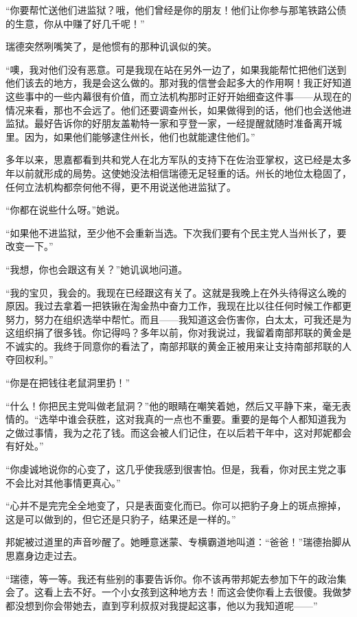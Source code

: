 \par “你要帮忙送他们进监狱？哦，他们曾经是你的朋友！他们让你参与那笔铁路公债的生意，你从中赚了好几千呢！”
\par 瑞德突然咧嘴笑了，是他惯有的那种讥讽似的笑。
\par “噢，我对他们没有恶意。可是我现在站在另外一边了，如果我能帮忙把他们送到他们该去的地方，我是会这么做的。那对我的信誉会起多大的作用啊！我正好知道这些事中的一些内幕很有价值，而立法机构那时正好开始细查这件事——从现在的情况来看，那也不会远了。他们还要调查州长，如果做得到的话，他们也会送他进监狱。最好告诉你的好朋友盖勒特一家和亨登一家，一经提醒就随时准备离开城里。因为，如果他们能够逮住州长，他们也就能逮住他们。”
\par 多年以来，思嘉都看到共和党人在北方军队的支持下在佐治亚掌权，这已经是太多年以前就形成的局势。这使她没法相信瑞德无足轻重的话。州长的地位太稳固了，任何立法机构都奈何他不得，更不用说送他进监狱了。
\par “你都在说些什么呀。”她说。
\par “如果他不进监狱，至少他不会重新当选。下次我们要有个民主党人当州长了，要改变一下。”
\par “我想，你也会跟这有关？”她讥讽地问道。
\par “我的宝贝，我会的。我现在已经跟这有关了。这就是我晚上在外头待得这么晚的原因。我过去拿着一把铁锹在淘金热中奋力工作，我现在比以往任何时候工作都更努力，努力在组织选举中帮忙。而且——我知道这会伤害你，白太太，可我还是为这组织捐了很多钱。你记得吗？多年以前，你对我说过，我留着南部邦联的黄金是不诚实的。我终于同意你的看法了，南部邦联的黄金正被用来让支持南部邦联的人夺回权利。”
\par “你是在把钱往老鼠洞里扔！”
\par “什么！你把民主党叫做老鼠洞？”他的眼睛在嘲笑着她，然后又平静下来，毫无表情的。“选举中谁会获胜，这对我真的一点也不重要。重要的是每个人都知道我为之做过事情，我为之花了钱。而这会被人们记住，在以后若干年中，这对邦妮都会有好处。”
\par “你虔诚地说你的心变了，这几乎使我感到很害怕。但是，我看，你对民主党之事不会比对其他事情更真心。”
\par “心并不是完完全全地变了，只是表面变化而已。你可以把豹子身上的斑点擦掉，这是可以做到的，但它还是只豹子，结果还是一样的。”
\par 邦妮被过道里的声音吵醒了。她睡意迷蒙、专横霸道地叫道：“爸爸！”瑞德抬脚从思嘉身边走过去。
\par “瑞德，等一等。我还有些别的事要告诉你。你不该再带邦妮去参加下午的政治集会了。这看上去不好。一个小女孩到这种地方去！而这会使你看上去很傻。我做梦都没想到你会带她去，直到亨利叔叔对我提起这事，他以为我知道呢——”
